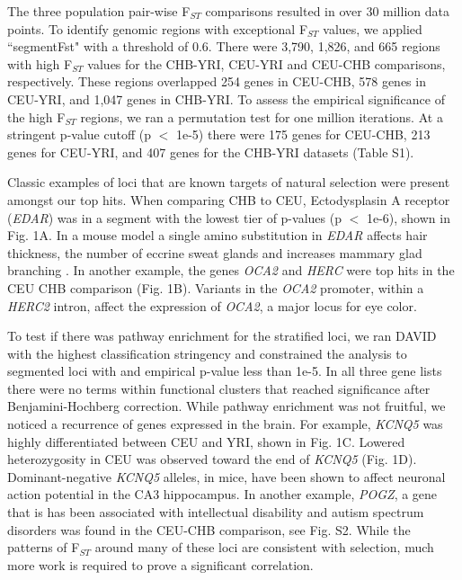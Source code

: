 \documentclass[10pt,letterpaper]{article}
\begin{document}
The three population pair-wise F$_{ST}$ comparisons resulted in over 30 million data points. To identify genomic regions with exceptional  F$_{ST}$ values, we applied ``segmentFst" with a threshold of 0.6.   There were 3,790, 1,826, and 665 regions with high F$_{ST}$  values for the CHB-YRI, CEU-YRI and CEU-CHB comparisons, respectively.  These regions overlapped 254 genes in CEU-CHB, 578 genes in CEU-YRI, and 1,047 genes in CHB-YRI.   To assess the empirical significance of the high  F$_{ST}$ regions, we ran a permutation test for one million iterations.  At a stringent p-value cutoff (p $<$ 1e-5) there were 175 genes for CEU-CHB, 213 genes for CEU-YRI, and 407 genes for the CHB-YRI datasets (Table S1).   

Classic examples of loci that are known targets of natural selection were present amongst our top hits. When comparing CHB to CEU, Ectodysplasin A receptor (\textit{EDAR}) was in a segment with the lowest tier of p-values (p $<$ 1e-6), shown in Fig. 1A. In a mouse model a single amino substitution in \textit{EDAR} affects hair thickness, the number of eccrine sweat glands and increases mammary glad branching \cite{edar}. In another example, the genes \textit{OCA2} and \textit{HERC} were top hits in the CEU CHB comparison (Fig. 1B).  Variants in the \textit{OCA2} promoter, within a \textit{HERC2} intron, affect the expression of \textit{OCA2}, a major locus for eye color\cite{oca2}.  

To test if there was pathway enrichment for the stratified loci, we ran DAVID with the highest classification stringency and constrained the analysis to segmented loci with and empirical p-value less than 1e-5\cite{david}. In all three gene lists there were no terms within functional clusters that reached significance after Benjamini-Hochberg correction.  While pathway enrichment was not fruitful, we noticed a recurrence of genes expressed in the brain.  For example, \textit{KCNQ5} was highly differentiated between CEU and YRI, shown in Fig. 1C.  Lowered heterozygosity in CEU was observed toward the end of \textit{KCNQ5}  (Fig. 1D).  Dominant-negative \textit{KCNQ5} alleles, in mice, have been shown to affect neuronal action potential in the CA3 hippocampus\cite{kcnq5}.  In another example, \textit{POGZ}, a gene that is has been associated with intellectual disability and autism spectrum disorders was found in the CEU-CHB comparison, see Fig. S2.  While the patterns of F$_{ST}$ around many of these loci are consistent with selection, much more work is required to prove a significant correlation.
\end{document}
